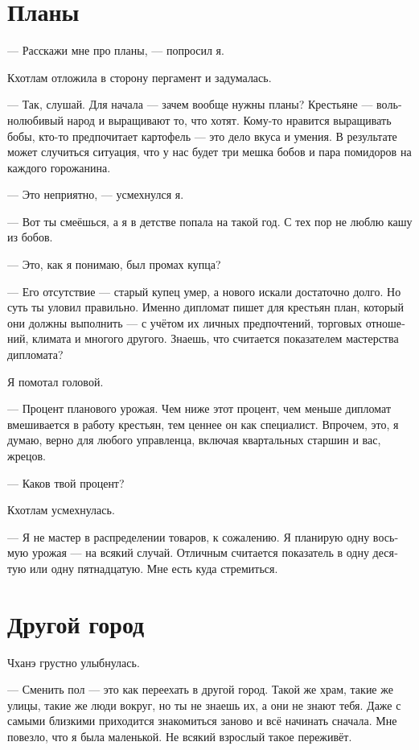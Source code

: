 \documentclass[a4paper,12pt,fleqn]{book}\usepackage{polyglossia}\setdefaultlanguage[babelshorthands=true]{russian}\setotherlanguage{english}\defaultfontfeatures{Ligatures=TeX,Mapping=tex-text}\usepackage{xcolor}\newcommand{\ml}[3]{#2}
\begin{document}
{\section{Планы}

--- Расскажи мне про планы, --- попросил я.

Кхотлам отложила в сторону пергамент и задумалась.

--- Так, слушай.
Для начала --- зачем вообще нужны планы?
Крестьяне --- вольнолюбивый народ и выращивают то, что хотят.
Кому-то нравится выращивать бобы, кто-то предпочитает картофель --- это дело вкуса и умения.
В результате может случиться ситуация, что у нас будет три мешка бобов и пара помидоров на каждого горожанина.

--- Это неприятно, --- усмехнулся я.

--- Вот ты смеёшься, а я в детстве попала на такой год.
С тех пор не люблю кашу из бобов.

--- Это, как я понимаю, был промах купца?

--- Его отсутствие --- старый купец умер, а нового искали достаточно долго.
Но суть ты уловил правильно.
Именно дипломат пишет для крестьян план, который они должны выполнить --- с учётом их личных предпочтений, торговых отношений, климата и многого другого.
Знаешь, что считается показателем мастерства дипломата?

Я помотал головой.

--- Процент планового урожая.
Чем ниже этот процент, чем меньше дипломат вмешивается в работу крестьян, тем ценнее он как специалист.
Впрочем, это, я думаю, верно для любого управленца, включая квартальных старшин и вас, жрецов.

--- Каков твой процент?

Кхотлам усмехнулась.

--- Я не мастер в распределении товаров, к сожалению.
Я планирую одну восьмую урожая --- на всякий случай.
Отличным считается показатель в одну десятую или одну пятнадцатую.
Мне есть куда стремиться.

\section{Другой город}

Чханэ грустно улыбнулась.

--- Сменить пол --- это как переехать в другой город.
Такой же храм, такие же улицы, такие же люди вокруг, но ты не знаешь их, а они не знают тебя.
Даже с самыми близкими приходится знакомиться заново и всё начинать сначала.
Мне повезло, что я была маленькой.
Не всякий взрослый такое переживёт.

}
\end{document}
